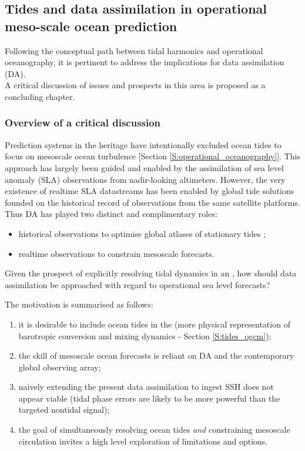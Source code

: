 \newpage
\subsection{Tides and data assimilation in operational meso-scale ocean prediction}
\label{S:plan_DA}

Following the conceptual path between tidal harmonics and operational oceanography, it is pertinent to address the implications for data assimilation (DA).\\
A critical discussion of issues and prospects in this area is proposed as a concluding chapter.\\


\subsubsection{Overview of a critical discussion}
Prediction systems in the \GODAE{} heritage have intentionally excluded ocean tides to focus on mesoscale ocean turbulence [Section \ref{S:operational_oceanography}].  This approach has largely been guided and enabled by the assimilation of sea level anomaly (SLA) observations from nadir-looking altimeters.  
However, the very existence of realtime SLA datastreams has been enabled by global tide solutions founded on the historical record of observations from the same satellite platforms.\\
Thus DA has played two distinct and complimentary roles:
\begin{itemize}
\item historical observations to optimise global atlases of stationary tides \citep{Egbert:1996vr};
\item realtime observations to constrain mesoscale \OGCM{} forecasts. 
\end{itemize}


\BoxBegin
Given the prospect of explicitly resolving tidal dynamics in an \OGCM{}, how should data assimilation be approached with regard to operational sea level forecasts? \\
\BoxEnd

The motivation is summarised as follows:
\begin{enumerate}
\item it is desirable to include ocean tides in the \OGCM{} (more physical representation of barotropic conversion and mixing dynamics - Section \ref{S:tides_ogcm});
\item the skill of mesoscale ocean forecasts is reliant on DA and the contemporary global observing array;
\item naively extending the present \OGCM{} data assimilation to ingest SSH does not appear viable (tidal phase errors are likely to be more powerful than the targeted nontidal signal); 
\item the goal of simultaneously resolving ocean tides \emph{and} constraining mesoscale circulation invites a high level exploration of limitations and options.
\end{enumerate}

